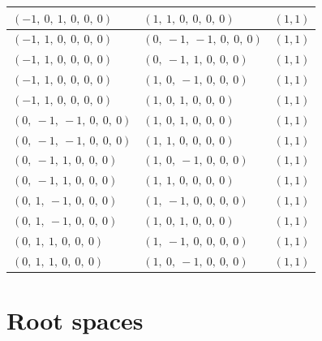 \documentclass[11pt]{article}
\theoremstyle{definition}
\begin{document}
\begin{center}
\begin{tabular}{|l|l|c|}
    \hline
    $\left( -1, \  0, \  1, \  0, \  0, \  0\right)$ & $\left( 1, \  1, \  0, \  0, \  0, \  0\right)$ & $(1,1)$ \\
    \hline
    $\left( -1, \  1, \  0, \  0, \  0, \  0\right)$ & $\left( 0, \  -1, \  -1, \  0, \  0, \  0\right)$ & $(1,1)$ \\
    \hline
    $\left( -1, \  1, \  0, \  0, \  0, \  0\right)$ & $\left( 0, \  -1, \  1, \  0, \  0, \  0\right)$ & $(1,1)$ \\
    \hline
    $\left( -1, \  1, \  0, \  0, \  0, \  0\right)$ & $\left( 1, \  0, \  -1, \  0, \  0, \  0\right)$ & $(1,1)$ \\
    \hline
    $\left( -1, \  1, \  0, \  0, \  0, \  0\right)$ & $\left( 1, \  0, \  1, \  0, \  0, \  0\right)$ & $(1,1)$ \\
    \hline
    $\left( 0, \  -1, \  -1, \  0, \  0, \  0\right)$ & $\left( 1, \  0, \  1, \  0, \  0, \  0\right)$ & $(1,1)$ \\
    \hline
    $\left( 0, \  -1, \  -1, \  0, \  0, \  0\right)$ & $\left( 1, \  1, \  0, \  0, \  0, \  0\right)$ & $(1,1)$ \\
    \hline
    $\left( 0, \  -1, \  1, \  0, \  0, \  0\right)$ & $\left( 1, \  0, \  -1, \  0, \  0, \  0\right)$ & $(1,1)$ \\
    \hline
    $\left( 0, \  -1, \  1, \  0, \  0, \  0\right)$ & $\left( 1, \  1, \  0, \  0, \  0, \  0\right)$ & $(1,1)$ \\
    \hline
    $\left( 0, \  1, \  -1, \  0, \  0, \  0\right)$ & $\left( 1, \  -1, \  0, \  0, \  0, \  0\right)$ & $(1,1)$ \\
    \hline
    $\left( 0, \  1, \  -1, \  0, \  0, \  0\right)$ & $\left( 1, \  0, \  1, \  0, \  0, \  0\right)$ & $(1,1)$ \\
    \hline
    $\left( 0, \  1, \  1, \  0, \  0, \  0\right)$ & $\left( 1, \  -1, \  0, \  0, \  0, \  0\right)$ & $(1,1)$ \\
    \hline
    $\left( 0, \  1, \  1, \  0, \  0, \  0\right)$ & $\left( 1, \  0, \  -1, \  0, \  0, \  0\right)$ & $(1,1)$ \\
    \hline
\end{tabular}
\end{center}


\section{Root spaces}
\end{document}

